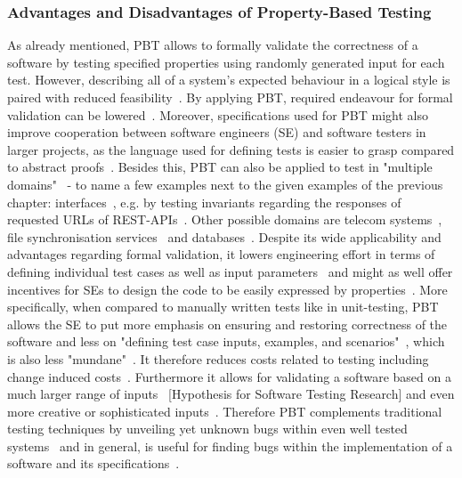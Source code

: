 \documentclass[runningheads]{llncs}
\begin{document}
\subsubsection{Advantages and Disadvantages of Property-Based Testing}
As already mentioned, PBT allows to formally validate the correctness of a software by testing specified properties using randomly generated input for each test. However, describing all of a system's expected behaviour in a logical style is paired with reduced feasibility~\cite{Chen2022,Koopman2012}. By applying PBT, required endeavour for formal validation can be lowered~\cite{Hritcu2016,Chen2022,Paraskevopoulou2015}. Moreover, specifications used for PBT might also improve cooperation between software engineers (SE) and software testers in larger projects, as the language used for defining tests is easier to grasp compared to abstract proofs~\cite{Chen2022,Loescher2017}. Besides this, PBT can also be applied to test in "multiple domains"~\cite{Karlsson2019} - to name a few examples next to the given examples of the previous chapter: interfaces~\cite{Karlsson2019,Francisco2013,LamelaSeijas2013}, e.g. by testing invariants regarding the responses of requested URLs of REST-APIs~\cite{Karlsson2019}. Other possible domains are telecom systems~\cite{Arts2006}, file synchronisation services~\cite{Hughes2016} and databases~\cite{Arts2015}. Despite its wide applicability and advantages regarding formal validation, it lowers engineering effort in terms of defining individual test cases as well as input parameters~\cite{Chen2022,Loescher2017,Corgozinho2023} and might as well offer incentives for SEs to design the code to be easily expressed by properties~\cite{Chen2022}. More specifically, when compared to manually written tests like in unit-testing, PBT allows the SE to put more emphasis on ensuring and restoring correctness of the software and less on "defining test case inputs, examples, and scenarios"~\cite{Corgozinho2023}, which is also less "mundane"~\cite{Loescher2017}. It therefore reduces costs related to testing including change induced costs~\cite{Chen2022,Loescher2017}. Furthermore it allows for validating a software based on a much larger range of inputs~\cite{Loescher2017} [Hypothesis for Software Testing Research] and even more creative or sophisticated inputs~\cite{Arts2015}. Therefore PBT complements traditional testing techniques by unveiling yet unknown bugs within even well tested systems~\cite{Arts2015,Hughes2016,Arts2006} and in general, is useful for finding bugs within the implementation of a software and its specifications~\cite{Chen2022,Fink1997,Loescher2017,Paraskevopoulou2015,Claessen2000,Corgozinho2023}.
\end{document}
